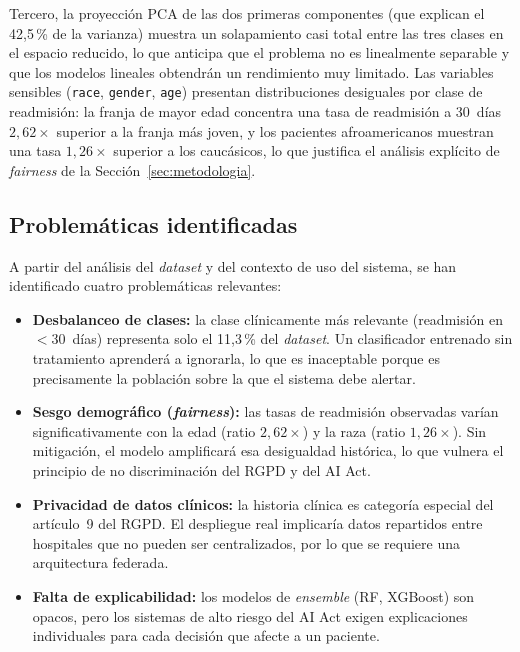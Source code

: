 \documentclass[11pt,a4paper]{article}
\begin{document}
Tercero, la proyección PCA de las dos primeras componentes (que explican el 42{,}5\,\% de la varianza) muestra un solapamiento casi total entre las tres clases en el espacio reducido, lo que anticipa que el problema no es linealmente separable y que los modelos lineales obtendrán un rendimiento muy limitado. Las variables sensibles (\texttt{race}, \texttt{gender}, \texttt{age}) presentan distribuciones desiguales por clase de readmisión: la franja de mayor edad concentra una tasa de readmisión a 30~días $2{,}62\times$ superior a la franja más joven, y los pacientes afroamericanos muestran una tasa $1{,}26\times$ superior a los caucásicos, lo que justifica el análisis explícito de \textit{fairness} de la Sección~\ref{sec:metodologia}.

\subsection{Problemáticas identificadas}
\label{sec:problematicas}

A partir del análisis del \textit{dataset} y del contexto de uso del sistema, se han identificado cuatro problemáticas relevantes:

\begin{itemize}
    \item \textbf{Desbalanceo de clases:} la clase clínicamente más relevante (readmisión en $<$30~días) representa solo el 11{,}3\,\% del \textit{dataset}. Un clasificador entrenado sin tratamiento aprenderá a ignorarla, lo que es inaceptable porque es precisamente la población sobre la que el sistema debe alertar.
    \item \textbf{Sesgo demográfico (\textit{fairness}):} las tasas de readmisión observadas varían significativamente con la edad (ratio $2{,}62\times$) y la raza (ratio $1{,}26\times$). Sin mitigación, el modelo amplificará esa desigualdad histórica, lo que vulnera el principio de no discriminación del RGPD y del AI Act.
    \item \textbf{Privacidad de datos clínicos:} la historia clínica es categoría especial del artículo~9 del RGPD. El despliegue real implicaría datos repartidos entre hospitales que no pueden ser centralizados, por lo que se requiere una arquitectura federada.
    \item \textbf{Falta de explicabilidad:} los modelos de \textit{ensemble} (RF, XGBoost) son opacos, pero los sistemas de alto riesgo del AI Act exigen explicaciones individuales para cada decisión que afecte a un paciente.
\end{itemize}
\end{document}
